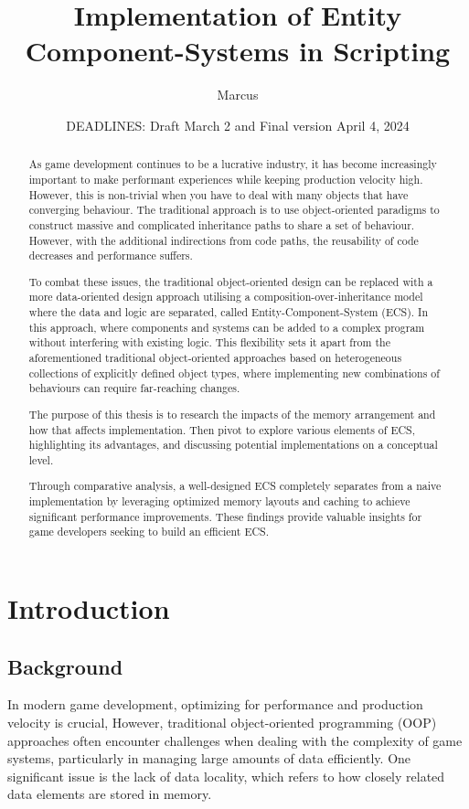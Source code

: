 \documentclass[openany, amssymb, psamsfonts]{amsart}
\title{Implementation of Entity Component-Systems in Scripting }
\author{Marcus}
\date{DEADLINES: Draft March 2 and Final version April 4, 2024}
\theoremstyle{definition}
\numberwithin{equation}{section}
\begin{document}
\begin{abstract}

As game development continues to be a lucrative industry, it has become increasingly 
important to make performant experiences while keeping production velocity high\cite{Martin}. 
However, this is non-trivial when you have to deal with many objects that have converging 
behaviour. The traditional approach is to use object-oriented paradigms to construct 
massive and complicated inheritance paths to share a set of behaviour. However, with 
the additional indirections from code paths, the reusability of code decreases and 
performance suffers\cite{Muratori}.

To combat these issues, the traditional object-oriented design can be replaced with a more 
data-oriented design approach utilising a composition-over-inheritance model where the data 
and logic are separated, called Entity-Component-System (ECS). In this approach, where 
components and systems can be added to a complex program without interfering with existing logic. 
This flexibility sets it apart from the aforementioned traditional object-oriented approaches 
based on heterogeneous collections of explicitly defined object types, where implementing new 
combinations of behaviours can require far-reaching changes.

The purpose of this thesis is to research the impacts of the memory arrangement and how that 
affects implementation. Then pivot to explore various elements of ECS, highlighting its 
advantages, and discussing potential implementations on a conceptual level.

Through comparative analysis, a well-designed ECS completely separates from a naive implementation 
by leveraging optimized memory layouts and caching to achieve significant performance improvements. 
These findings provide valuable insights for game developers seeking to build an efficient ECS.

\end{abstract}

\maketitle

\tableofcontents

\section{Introduction} 

\subsection{Background} In modern game development, optimizing for performance and production 
velocity is crucial, However, traditional object-oriented programming (OOP) approaches 
often encounter challenges when dealing with the complexity of game systems, particularly 
in managing large amounts of data efficiently. One significant issue is the lack of data 
locality, which refers to how closely related data elements are stored in memory.
\end{document}
